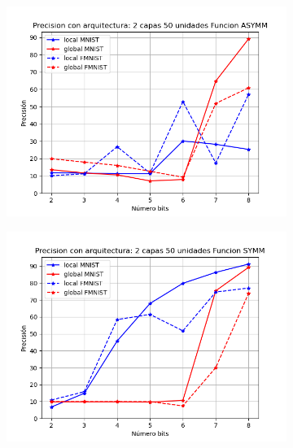 \begin{figure}[H]
    \centering
    \begin{subfigure}[H]{0.475\textwidth}
    \includegraphics[width=\textwidth]{imagenes/fa/Precision con arquitectura: 2 capas 50 unidades Funcion ASYMM.png}
    \end{subfigure}
    \begin{subfigure}[H]{0.475\textwidth}
    \includegraphics[width=\textwidth]{imagenes/fa/Precision con arquitectura: 2 capas 50 unidades Funcion SYMM.png}
    \end{subfigure}
    \begin{subfigure}[H]{0.475\textwidth}

\end{subfigure}
\end{figure}
